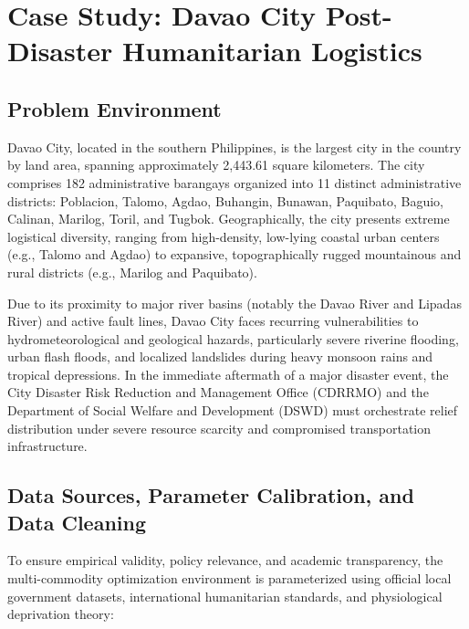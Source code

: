 \section{Case Study: Davao City Post-Disaster Humanitarian Logistics}

\subsection{Problem Environment}
Davao City, located in the southern Philippines, is the largest city in the country by land area, spanning approximately 2,443.61 square kilometers. The city comprises 182 administrative barangays organized into 11 distinct administrative districts: Poblacion, Talomo, Agdao, Buhangin, Bunawan, Paquibato, Baguio, Calinan, Marilog, Toril, and Tugbok. Geographically, the city presents extreme logistical diversity, ranging from high-density, low-lying coastal urban centers (e.g., Talomo and Agdao) to expansive, topographically rugged mountainous and rural districts (e.g., Marilog and Paquibato).

Due to its proximity to major river basins (notably the Davao River and Lipadas River) and active fault lines, Davao City faces recurring vulnerabilities to hydrometeorological and geological hazards, particularly severe riverine flooding, urban flash floods, and localized landslides during heavy monsoon rains and tropical depressions. In the immediate aftermath of a major disaster event, the City Disaster Risk Reduction and Management Office (CDRRMO) and the Department of Social Welfare and Development (DSWD) must orchestrate relief distribution under severe resource scarcity and compromised transportation infrastructure.

\subsection{Data Sources, Parameter Calibration, and Data Cleaning}
To ensure empirical validity, policy relevance, and academic transparency, the multi-commodity optimization environment is parameterized using official local government datasets, international humanitarian standards, and physiological deprivation theory:

